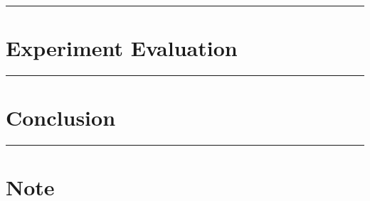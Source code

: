 \documentclass[letterpaper,10pt]{article}
\newcommand{\panhline}{\begin{center}\rule{\textwidth}{1pt}\end{center}}
\begin{document}
\panhline


\section{Experiment Evaluation}





\panhline


\section{Conclusion}





\panhline


\section{Note}
\end{document}

